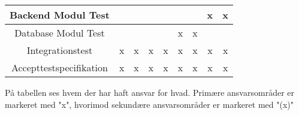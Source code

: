 \begin{center}
\begin{longtable}{|c|c|c|c|c|c|c|c|c|}
    Backend Modul Test          &        &       &       &        &        &       & x     & x      \\ \hline
    Database Modul Test          &        &       &       &        & x      & x     &       &        \\ \hline
    Integrationstest            & x      & x     & x     & x      & x      & x     & x     & x      \\ \hline
    Accepttestspecifikation     & x      & x     & x     & x      & x      & x     & x     & x      \\ \hline
  \end{longtable}
  \caption{På tabellen ses hvem der har haft ansvar for hvad. Primære ansvarsområder er markeret med "x", hvorimod sekundære ansvarsområder er markeret med "(x)"}
  \addtocounter{table}{-1}
\end{center}

\newpage
